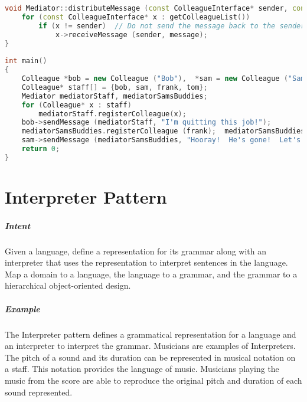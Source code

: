 \documentclass{book}
\begin{document}
\begin{lstlisting}[caption={Mediator Pattern Sample 3},language=C++]
void Mediator::distributeMessage (const ColleagueInterface* sender, const std::string& message) const {
	for (const ColleagueInterface* x : getColleagueList())
		if (x != sender)  // Do not send the message back to the sender
			x->receiveMessage (sender, message);
}
 
int main() 
{
	Colleague *bob = new Colleague ("Bob"),  *sam = new Colleague ("Sam"),  *frank = new Colleague ("Frank"),  *tom = new Colleague ("Tom");
	Colleague* staff[] = {bob, sam, frank, tom};
	Mediator mediatorStaff, mediatorSamsBuddies;
	for (Colleague* x : staff)
		mediatorStaff.registerColleague(x);
	bob->sendMessage (mediatorStaff, "I'm quitting this job!");
	mediatorSamsBuddies.registerColleague (frank);  mediatorSamsBuddies.registerColleague (tom);  // Sam's buddies only
	sam->sendMessage (mediatorSamsBuddies, "Hooray!  He's gone!  Let's go for a drink, guys!");	
	return 0;
}

\end{lstlisting}

\chapter{Interpreter Pattern}\label{InterpreterPattern}

\paragraph{Intent}
    Given a language, define a representation for its grammar along with an interpreter that uses the representation to interpret sentences in the language.
    Map a domain to a language, the language to a grammar, and the grammar to a hierarchical object-oriented design.




\begin{figure}[H]
\begin{floatrow}
\end{floatrow}
\end{figure}
\paragraph{Example}

The Interpreter pattern defines a grammatical representation for a language and an interpreter to interpret the grammar. Musicians are examples of Interpreters. The pitch of a sound and its duration can be represented in musical notation on a staff. This notation provides the language of music. Musicians playing the music from the score are able to reproduce the original pitch and duration of each sound represented. 
\end{document}

